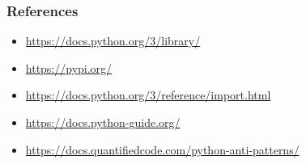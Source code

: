 \documentclass[9pt]{beamer}
\begin{document}
  
\begin{frame}
  \frametitle{References}
  \scriptsize
  \begin{itemize}
  \item \url{https://docs.python.org/3/library/}
  \item \url{https://pypi.org/}
  \item \url{https://docs.python.org/3/reference/import.html}
  \item \url{https://docs.python-guide.org/}
  \item \url{https://docs.quantifiedcode.com/python-anti-patterns/}
  \end{itemize}
\end{frame}
\end{document}
